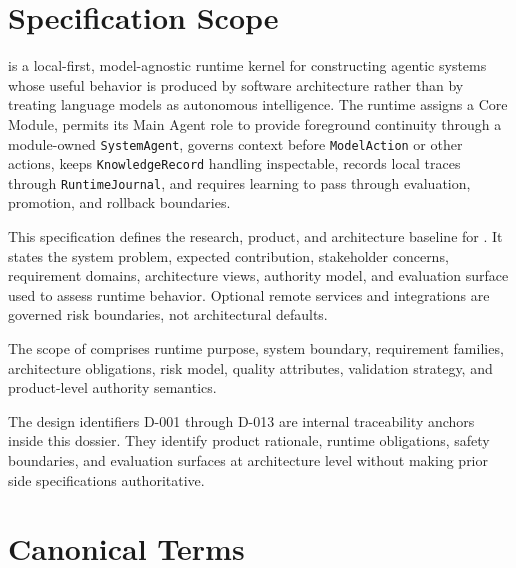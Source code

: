 \documentclass[11pt]{report}
\begin{document}
\section*{Specification Scope}

\Madre is a local-first, model-agnostic runtime kernel for constructing agentic systems whose useful behavior is produced by software architecture rather than by treating language models as autonomous intelligence. The runtime assigns a Core Module, permits its Main Agent role to provide foreground continuity through a module-owned \texttt{SystemAgent}, governs context before \texttt{ModelAction} or other actions, keeps \texttt{KnowledgeRecord} handling inspectable, records local traces through \texttt{RuntimeJournal}, and requires learning to pass through evaluation, promotion, and rollback boundaries.

This specification defines the research, product, and architecture baseline for \madre. It states the system problem, expected contribution, stakeholder concerns, requirement domains, architecture views, authority model, and evaluation surface used to assess runtime behavior. Optional remote services and integrations are governed risk boundaries, not architectural defaults.

The scope of \Madre comprises runtime purpose, system boundary, requirement families, architecture obligations, risk model, quality attributes, validation strategy, and product-level authority semantics.\n

The design identifiers D-001 through D-013 are internal traceability anchors inside this dossier. They identify product rationale, runtime obligations, safety boundaries, and evaluation surfaces at architecture level without making prior side specifications authoritative.

\section*{Canonical Terms}
\end{document}

